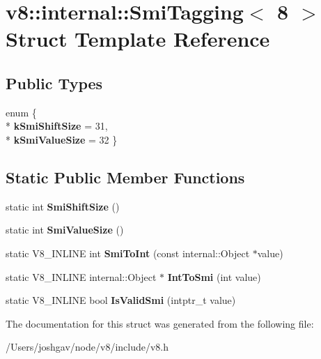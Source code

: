 \hypertarget{structv8_1_1internal_1_1_smi_tagging_3_018_01_4}{}\section{v8\+:\+:internal\+:\+:Smi\+Tagging$<$ 8 $>$ Struct Template Reference}
\label{structv8_1_1internal_1_1_smi_tagging_3_018_01_4}
\subsection*{Public Types}
\begin{DoxyCompactItemize}
\item 
enum \{ \\*
{\bfseries k\+Smi\+Shift\+Size} = 31, 
\\*
{\bfseries k\+Smi\+Value\+Size} = 32
 \}\hypertarget{structv8_1_1internal_1_1_smi_tagging_3_018_01_4_aca1e57809e36a53b790ee0480324fb7b}{}\label{structv8_1_1internal_1_1_smi_tagging_3_018_01_4_aca1e57809e36a53b790ee0480324fb7b}

\end{DoxyCompactItemize}
\subsection*{Static Public Member Functions}
\begin{DoxyCompactItemize}
\item 
static int {\bfseries Smi\+Shift\+Size} ()\hypertarget{structv8_1_1internal_1_1_smi_tagging_3_018_01_4_a4fb28f586fdee8316a03f9b8f94b945d}{}\label{structv8_1_1internal_1_1_smi_tagging_3_018_01_4_a4fb28f586fdee8316a03f9b8f94b945d}

\item 
static int {\bfseries Smi\+Value\+Size} ()\hypertarget{structv8_1_1internal_1_1_smi_tagging_3_018_01_4_a836e783af92beb7ca9cc8cdabef43ab2}{}\label{structv8_1_1internal_1_1_smi_tagging_3_018_01_4_a836e783af92beb7ca9cc8cdabef43ab2}

\item 
static V8\+\_\+\+I\+N\+L\+I\+NE int {\bfseries Smi\+To\+Int} (const internal\+::\+Object $\ast$value)\hypertarget{structv8_1_1internal_1_1_smi_tagging_3_018_01_4_a040db1ceee3195c2463075b7b50cfda0}{}\label{structv8_1_1internal_1_1_smi_tagging_3_018_01_4_a040db1ceee3195c2463075b7b50cfda0}

\item 
static V8\+\_\+\+I\+N\+L\+I\+NE internal\+::\+Object $\ast$ {\bfseries Int\+To\+Smi} (int value)\hypertarget{structv8_1_1internal_1_1_smi_tagging_3_018_01_4_a1926f38e35fc98fe244e8136180d70f2}{}\label{structv8_1_1internal_1_1_smi_tagging_3_018_01_4_a1926f38e35fc98fe244e8136180d70f2}

\item 
static V8\+\_\+\+I\+N\+L\+I\+NE bool {\bfseries Is\+Valid\+Smi} (intptr\+\_\+t value)\hypertarget{structv8_1_1internal_1_1_smi_tagging_3_018_01_4_a5ab93d4cf7c3b9ceff5116b3598a1f94}{}\label{structv8_1_1internal_1_1_smi_tagging_3_018_01_4_a5ab93d4cf7c3b9ceff5116b3598a1f94}

\end{DoxyCompactItemize}


The documentation for this struct was generated from the following file\+:\begin{DoxyCompactItemize}
\item 
/\+Users/joshgav/node/v8/include/v8.\+h\end{DoxyCompactItemize}
